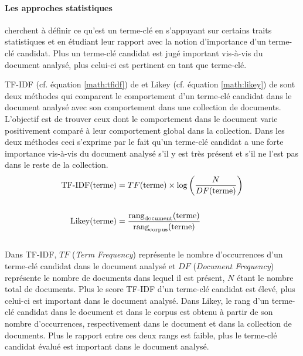       \paragraph{Les approches statistiques}
        cherchent à définir ce qu'est un terme-clé en s'appuyant sur certains
        traits statistiques et en étudiant leur rapport avec la notion
        d'importance d'un terme-clé candidat. Plus un terme-clé candidat est
        jugé important vis-à-vis du document analysé, plus celui-ci est
        pertinent en tant que terme-clé.

        TF-IDF (cf. équation \ref{math:tfidf}) de  et
        Likey (cf. équation \ref{math:likey}) de 
        sont deux méthodes qui comparent le comportement d'un terme-clé
        candidat dans le document analysé avec son comportement dans une
        collection de documents. L'objectif est de trouver ceux dont le
        comportement dans le document varie positivement comparé à leur
        comportement global dans la collection. Dans les deux méthodes ceci
        s'exprime par le fait qu'un terme-clé candidat a une forte importance
        vis-à-vis du document analysé s'il y est très présent et s'il ne l'est
        pas dans le reste de la collection.
        \begin{align}
          \text{TF-IDF}(\text{terme}) &= TF(\text{terme}) \times \log\left(\frac{N}{DF(\text{terme})}\right) \label{math:tfidf}\\
          \notag\\
          \text{Likey}(\text{terme}) &= \frac{\text{rang}_{\text{document}}(\text{terme})}{\text{rang}_{\text{corpus}}(\text{terme})} \label{math:likey}
        \end{align}\\
        Dans TF-IDF, $TF$ (\textit{Term Frequency}) représente le nombre
        d'occurrences d'un terme-clé candidat dans le document analysé et $DF$
        (\textit{Document Frequency}) représente le nombre de documents dans
        lequel il est présent, $N$ étant le nombre total de documents. Plus le
        score TF-IDF d'un terme-clé candidat est élevé, plus celui-ci est
        important dans le document analysé. Dans Likey, le rang d'un terme-clé
        candidat dans le document et dans le corpus est obtenu à partir de son
        nombre d'occurrences, respectivement dans le document et dans la
        collection de documents. Plus le rapport entre ces deux rangs est
        faible, plus le terme-clé candidat évalué est important dans le
        document analysé.

